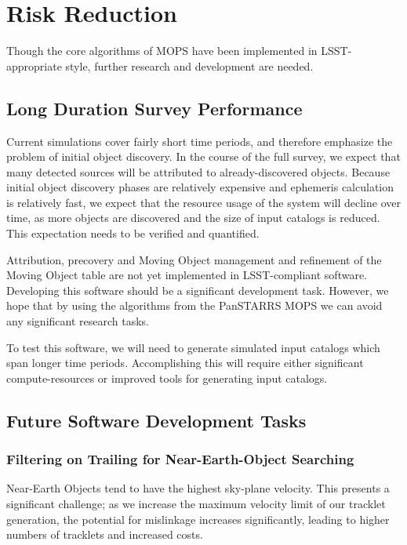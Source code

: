 \section{Risk Reduction}

Though the core algorithms of MOPS have been implemented in
LSST-appropriate style, further research and development are needed.



\subsection{Long Duration Survey Performance}

Current simulations cover fairly short time periods, and therefore
emphasize the problem of initial object discovery.  In the course of
the full survey, we expect that many detected sources will be
attributed to already-discovered objects.  Because initial object
discovery phases are relatively expensive and ephemeris calculation is
relatively fast, we expect that the resource usage of the system will
decline over time, as more objects are discovered and the size of
input catalogs is reduced.  This expectation needs to be verified and
quantified.

Attribution, precovery and Moving Object management and refinement of the
Moving Object table are not yet implemented in LSST-compliant software.
Developing this software should be a significant development task.
However, we hope that by using the algorithms from the PanSTARRS MOPS
we can avoid any significant research tasks.

To test this software, we will need to generate simulated input
catalogs which span longer time periods.  Accomplishing this will
require either significant compute-resources or improved tools for
generating input catalogs.


\subsection{Future Software Development Tasks}

\subsubsection{Filtering on Trailing for Near-Earth-Object Searching}

\label{neosTrailing}

Near-Earth Objects tend to have the highest sky-plane velocity.  This
presents a significant challenge; as we increase the maximum velocity
limit of our tracklet generation, the potential for mislinkage
increases significantly, leading to higher numbers of tracklets and
increased costs.  

